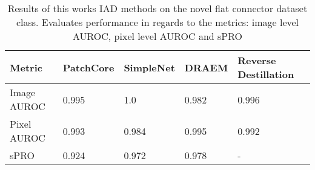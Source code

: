 \begin{table}[htbp]
    \tiny
    \centering
    \begin{tabularx}{\textwidth}{|X|X|X|X|X|}%
        \hline
        \textbf{Metric} & \textbf{PatchCore} \cite{patchCore2022} & \textbf{SimpleNet} \cite{liu2023simplenet} & \textbf{DRAEM} \cite{Zavrtanik_2021DRAEM} & \textbf{Reverse Destillation} \cite{revdist2023} \\
        \hline
        Image AUROC & 0.995 & 1.0 & 0.982 & 0.996 \\
        \hline
        Pixel AUROC & 0.993 & 0.984 & 0.995 & 0.992 \\
        \hline
        sPRO & 0.924 & 0.972 & 0.978 & - \\
        \hline
    \end{tabularx}
    \caption{Results of this works IAD methods on the novel flat connector dataset class. Evaluates performance in regards to the metrics: image level AUROC, pixel level AUROC and sPRO}
    \label{tab:flatconnectorperformance}
\end{table}
